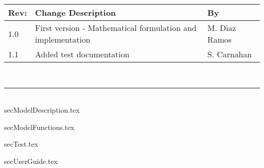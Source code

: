 \documentclass[]{BasiliskReportMemo}
\begin{document}
	
	\makeCover
	
	\pagestyle{empty}
	{\renewcommand{\arraystretch}{2}
		\noindent
		\begin{longtable}{|p{0.5in}|p{4.5in}|p{1.14in}|}
			\hline
			{\bfseries Rev}: & {\bfseries Change Description} & {\bfseries By} \\
			\hline
			1.0 & First version - Mathematical formulation and implementation & M. Diaz Ramos \\
			\hline
			1.1 & Added test documentation & S. Carnahan \\
			\hline
			
		\end{longtable}
	}
	
	\newpage
	\setcounter{page}{1}
	\pagestyle{fancy}
	
	\tableofcontents %
	~\\ \hrule ~\\ %
	
{secModelDescription.tex} %

{secModelFunctions.tex} %

{secTest.tex} %

{secUserGuide.tex} %

\end{document}
